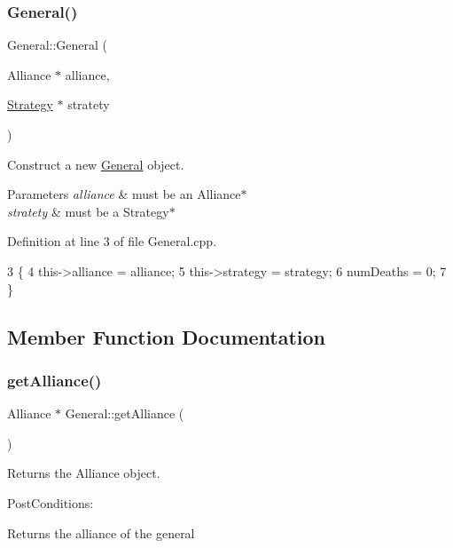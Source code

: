 \subsubsection{\texorpdfstring{General()}{General()}}
{\footnotesize\ttfamily General\+::\+General (\begin{DoxyParamCaption}\item[{Alliance $\ast$}]{alliance,  }\item[{\hyperlink{classStrategy}{Strategy} $\ast$}]{stratety }\end{DoxyParamCaption})}



Construct a new \hyperlink{classGeneral}{General} object. 


\begin{DoxyParams}{Parameters}
{\em alliance} & must be an Alliance$\ast$ \\
\hline
{\em stratety} & must be a Strategy$\ast$ \\
\hline
\end{DoxyParams}


Definition at line 3 of file General.\+cpp.


\begin{DoxyCode}
3                                                        \{
4     this->alliance = alliance;
5     this->strategy = strategy;
6     numDeaths = 0;
7 \}
\end{DoxyCode}


\subsection{Member Function Documentation}
\mbox{\label{classGeneral_a4cff7ae050a44bbbd077f4257078291c}} 
\subsubsection{\texorpdfstring{get\+Alliance()}{getAlliance()}}
{\footnotesize\ttfamily Alliance $\ast$ General\+::get\+Alliance (\begin{DoxyParamCaption}{ }\end{DoxyParamCaption})}



Returns the Alliance object. 

Post\+Conditions\+:
\begin{DoxyItemize}
\item Returns the alliance of the general
\end{DoxyItemize}

